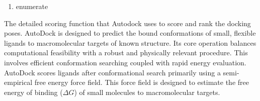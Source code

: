 \documentclass[11pt]{article}
\begin{document}
\begin{enumerate}
In essence, AutoDock searches for ligand conformations by performing numerous iterations of generating trial ligand positions and conformations (using SA, GA, or LGA), rapidly evaluating their energy with pre-computed grids, and then accepting or rejecting these trials based on the energy landscape and search algorithm's rules, ultimately aiming to find the lowest energy binding modes.
\item{enumerate}
\end{enumerate}
The detailed scoring function that Autodock uses to score and rank the docking poses.
AutoDock is designed to predict the bound conformations of small, flexible ligands to macromolecular targets of known structure. Its core operation balances computational feasibility with a robust and physically relevant procedure. This involves efficient conformation searching coupled with rapid energy evaluation.
AutoDock scores ligands after conformational search primarily using a semi-empirical free energy force field. This force field is designed to estimate the free energy of binding ($\Delta G$) of small molecules to macromolecular targets.
\end{document}
